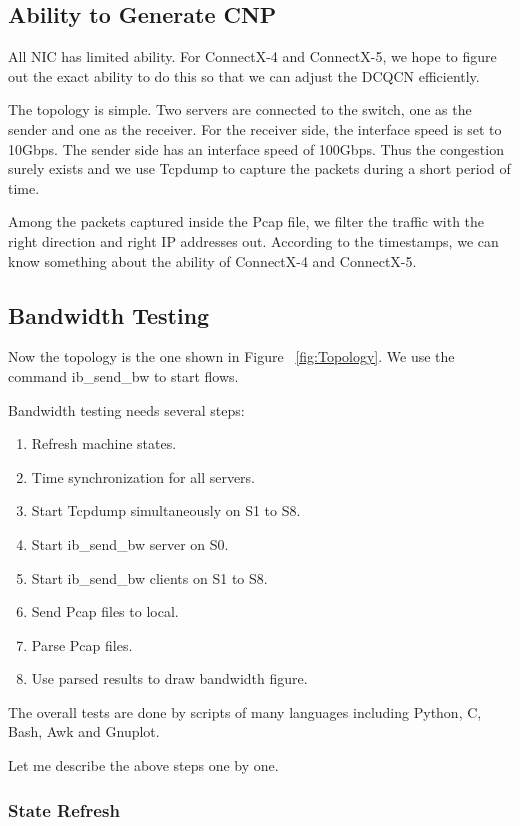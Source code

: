 \documentclass[12pt,a4paper]{article}
\begin{document}
\subsection{Ability to Generate CNP}

All NIC has limited ability. For ConnectX-4 and ConnectX-5, we hope to figure out the exact ability to do this so that we can adjust the DCQCN efficiently.

The topology is simple. Two servers are connected to the switch, one as the sender and one as the receiver.
For the receiver side, the interface speed is set to 10Gbps. The sender side has an interface speed of 100Gbps.
Thus the congestion surely exists and we use Tcpdump to capture the packets during a short period of time.

Among the packets captured inside the Pcap file, we filter the traffic with the right direction and right IP addresses out.
According to the timestamps, we can know something about the ability of ConnectX-4 and ConnectX-5.

\subsection{Bandwidth Testing}

Now the topology is the one shown in Figure ~\ref{fig:Topology}.
We use the command ib\_send\_bw to start flows.

Bandwidth testing needs several steps:
\begin{enumerate}
	\item Refresh machine states.
	\item Time synchronization for all servers.
	\item Start Tcpdump simultaneously on S1 to S8.
	\item Start ib\_send\_bw server on S0.
	\item Start ib\_send\_bw clients on S1 to S8.
	\item Send Pcap files to local.
	\item Parse Pcap files.
	\item Use parsed results to draw bandwidth figure.
\end{enumerate}

The overall tests are done by scripts of many languages including Python, C, Bash, Awk and Gnuplot.

Let me describe the above steps one by one.

\subsubsection{State Refresh}
\end{document}
